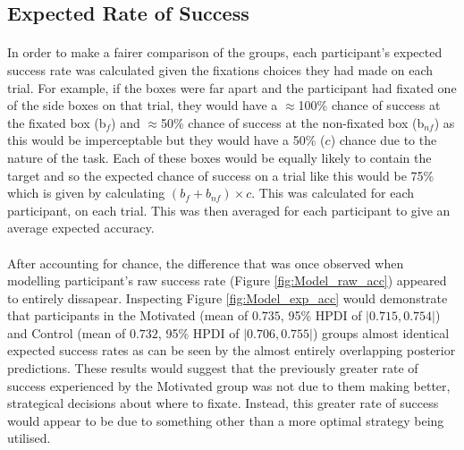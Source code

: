 \documentclass[12pt]{article}
\begin{document}
\subsection*{Expected Rate of Success}
\paragraph{} In order to make a fairer comparison of the groups, each participant's expected success rate was calculated given the fixations choices they had made on each trial. For example, if the boxes were far apart and the participant had fixated one of the side boxes on that trial, they would have a $\approx$100\% chance of success at the fixated box (b$_f$) and $\approx$50\% chance of success at the non-fixated box (b$_{nf}$) as this would be imperceptable but they would have a 50\% ($c$) chance due to the nature of the task. Each of these boxes would be equally likely to contain the target and so the expected chance of success on a trial like this would be 75\% which is given by calculating $(b_f + b_{nf})\times c$. This was calculated for each participant, on each trial. This was then averaged for each participant to give an average expected accuracy. 

\paragraph{} After accounting for chance, the difference that was once observed when modelling participant's raw success rate (Figure \ref{fig:Model_raw_acc}) appeared to entirely dissapear. Inspecting Figure \ref{fig:Model_exp_acc} would demonstrate that participants in the Motivated (mean of $0.735$, 95\% HPDI of $|0.715, 0.754|$) and Control (mean of $0.732$, 95\% HPDI of $|0.706, 0.755|$) groups almost identical expected success rates as can be seen by the almost entirely overlapping posterior predictions. These results would suggest that the previously greater rate of success experienced by the Motivated group was not due to them making better, strategical decisions about where to fixate. Instead, this greater rate of success would appear to be due to something other than a more optimal strategy being utilised. 
\end{document}

